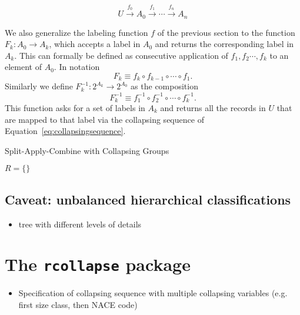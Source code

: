 \documentclass[11pt, fleqn]{article}
\begin{document}
\begin{equation}
U\xrightarrow{f_0}A_0\xrightarrow{f_1}\cdots\xrightarrow{f_n}A_n
\label{eq:collapsingsequence}
\end{equation}

We also generalize the labeling function $f$ of the previous section
to the function $F_k:A_0\to A_k$, which accepts a label in $A_0$ and 
returns the corresponding label in $A_k$. This can formally be defined 
as consecutive application of $f_1, f_2\cdots, f_k$ to an element of 
$A_0$. In notation
\begin{equation*}
F_k \equiv f_k\circ f_{k-1}\circ\cdots\circ f_1.
\end{equation*}
Similarly we define $F^{-1}_k:2^{A_k}\to 2^{A_0}$ as the composition
\begin{equation*}
F_k^{-1} \equiv f_1^{-1}\circ f_2^{-1}\circ\cdots\circ f_k^{-1}.
\end{equation*}
This function asks for a set of labels in $A_k$ and returns all the records in
$U$ that are mapped to that label via the collapsing sequence of
Equation~\eqref{eq:collapsingsequence}. 






\begin{algorithm}[H]
\caption{Split-Apply-Combine with Collapsing Groups}


$R = \{\}$\;

\end{algorithm}

\subsection{Caveat: unbalanced hierarchical classifications}
\begin{itemize}
\item tree with different levels of details
\end{itemize}

\section{The \texttt{rcollapse} package}

\begin{itemize}
\item{Specification of collapsing sequence with multiple collapsing variables (e.g. first size class, then NACE code)}
\end{itemize}



\end{document}

